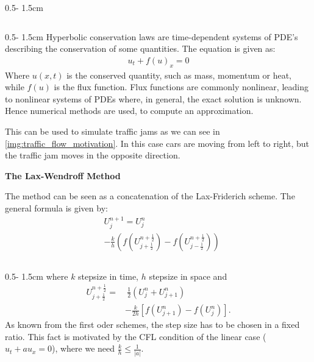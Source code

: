 \documentclass{uibposter}
\begin{document}
\begin{frame}[fragile]
\begin{columns}
\begin{column}{0.5\textwidth - 1.5cm}
\begin{column}{0.5\textwidth - 1.5cm}
Hyperbolic conservation laws are time-dependent systems of PDE's describing the conservation of some quantities. The equation is given as:
\begin{align*}
    u_t + f(u)_x = 0
\end{align*}
Where $u(x,t)$ is the conserved quantity, such as mass, momentum or heat, while $f(u)$ is the flux function. 
Flux functions are commonly nonlinear, leading to nonlinear systems of PDEs where, in general, the exact solution is unknown. Hence numerical methods are used, to compute an approximation. 

\vspace{0.5cm}
This can be used to simulate traffic jams as we can see in \cref{img:traffic_flow_motivation}. In this case cars are moving from left to right, but the traffic jam moves in the opposite direction. 

\vspace{0.5cm}
\textbf{The Lax-Wendroff Method}

\vspace{0.5cm}
The method can be seen as a concatenation of the Lax-Friderich scheme.
The general formula is given by:
\begin{align*}
&U_j^{n+1} = U_j^n\\
&- \frac{k}{h}\left(f\left(U_{j+\frac{1}{2}}^{n+\frac{1}{2}}\right) - f\left(U_{j-\frac{1}{2}}^{n+\frac{1}{2}}\right)\right)
\end{align*}

\end{column}
\begin{column}{0.5\textwidth - 1.5cm}
where $k$ stepsize in time, $h$ stepsize in space and
\begin{align*}
U_{j+\frac{1}{2}}^{n+\frac{1}{2}} =&~ \frac{1}{2} (U_j^n + U_{j+1}^n)\\
&- \frac{k}{2h}[f(U_{j+1}^n) - f(U_j^n)].
\end{align*}
As known from the first oder schemes, the step size has to be chosen in a fixed ratio. This fact is motivated by the CFL condition of the linear case ($u_t + au_x = 0$), where we need $\frac{k}{h} \leq \frac{1}{|a|}$. 


\end{column}
\end{column}
\end{columns}
\end{frame}
\end{document}
